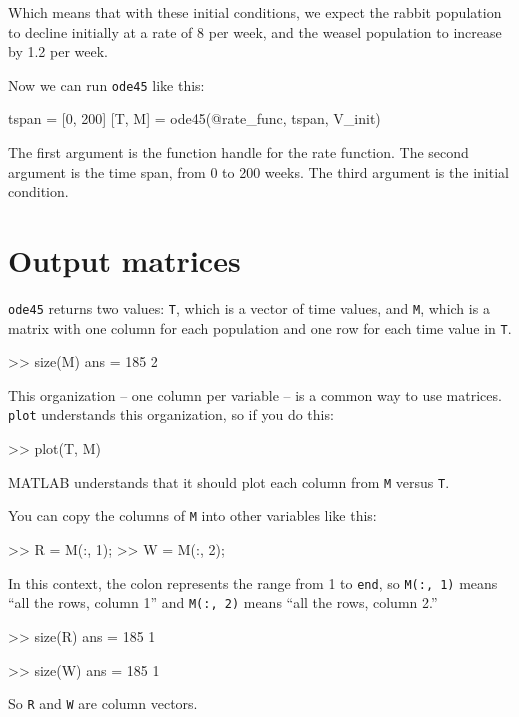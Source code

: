 \documentclass[
]{book}
\numberwithin{Answer}{chapter}
\numberwithin{Exercise}{chapter}
\begin{document}
Which means that with these initial conditions, we expect the rabbit population to decline initially at a rate of 8 per week, and the weasel population to increase by 1.2 per week.  
  
Now we can run {\tt ode45} like this:

\begin{code}
tspan = [0, 200]
[T, M] = ode45(@rate_func, tspan, V_init)
\end{code}

The first argument is the function handle for the rate function.
The second argument is the time span, from 0 to 200 weeks.
The third argument is the initial condition.


\section{Output matrices}

{\tt ode45} returns two values: {\tt T}, which is a vector of time values, and {\tt M}, which is a matrix with one column for each
population and one row for each time value in {\tt T}.

\begin{code}
>> size(M)
ans = 185     2
\end{code}

This organization -- one column per variable -- is a common way to
use matrices.  {\tt plot} understands this organization, so if you
do this:

\begin{code}
>> plot(T, M)
\end{code}

MATLAB understands that it should plot each column from {\tt M}
versus {\tt T}.

You can copy the columns of {\tt M} into other variables like
this:

\begin{code}
>> R = M(:, 1);
>> W = M(:, 2);
\end{code}

In this context, the colon represents the range from 1 to {\tt end},
so {\tt M(:, 1)} means ``all the rows, column 1'' and
{\tt M(:, 2)} means ``all the rows, column 2.''

\begin{code}
>> size(R)
ans = 185     1

>> size(W)
ans = 185     1
\end{code}

So {\tt R} and {\tt W} are column vectors.
\end{document}
